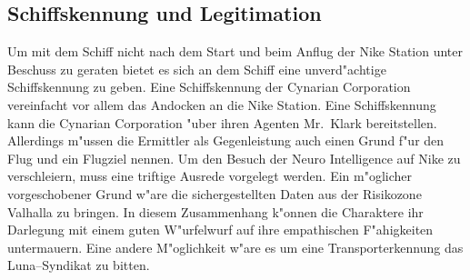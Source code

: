 \subsection{Schiffskennung und Legitimation}
Um mit dem Schiff nicht nach dem Start und beim Anflug der Nike Station unter Beschuss zu geraten bietet es sich an dem Schiff eine unverd"achtige Schiffskennung zu geben. Eine Schiffskennung der Cynarian Corporation vereinfacht vor allem das Andocken an die Nike Station. Eine Schiffskennung kann die Cynarian Corporation "uber ihren Agenten Mr.~Klark bereitstellen. Allerdings m"ussen die Ermittler als Gegenleistung auch einen Grund f"ur den Flug und ein Flugziel nennen. Um den Besuch der Neuro Intelligence auf Nike zu verschleiern, muss eine triftige Ausrede vorgelegt werden. Ein m"oglicher vorgeschobener Grund w"are die sichergestellten Daten aus der Risikozone Valhalla zu bringen. In diesem Zusammenhang k"onnen die Charaktere ihr Darlegung mit einem guten W"urfelwurf auf ihre empathischen F"ahigkeiten untermauern. Eine andere M"oglichkeit w"are es um eine Transporterkennung das Luna--Syndikat zu bitten.
